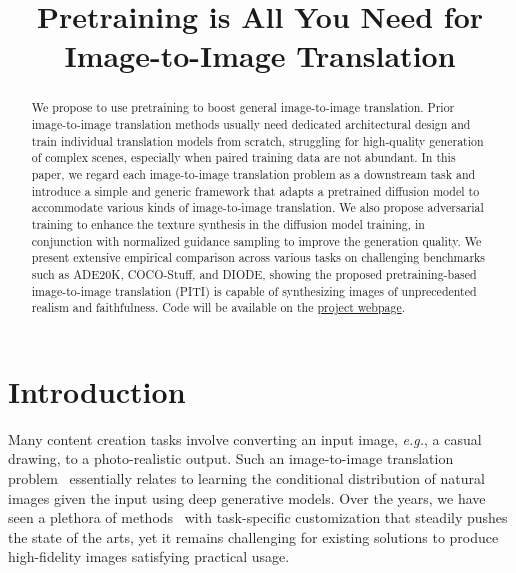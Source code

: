 \title{Pretraining is All You Need for Image-to-Image Translation}

\begin{abstract}
We propose to use pretraining to boost general image-to-image translation. Prior image-to-image translation methods usually need dedicated architectural design and train individual translation models from scratch, struggling for high-quality generation of complex scenes, especially when paired training data are not abundant. In this paper, we regard each image-to-image translation problem as a downstream task and introduce a simple and generic framework that adapts a pretrained diffusion model to accommodate various kinds of image-to-image translation. We also propose adversarial training to enhance the texture synthesis in the diffusion model training, in conjunction with normalized guidance sampling to improve the generation quality. We present extensive empirical comparison across various tasks on challenging benchmarks such as ADE20K, COCO-Stuff, and DIODE, showing the proposed pretraining-based image-to-image translation (PITI) is capable of synthesizing images of unprecedented realism and faithfulness. Code will be available on the \href{https://tengfei-wang.github.io/PITI/index.html}{project webpage}.
\end{abstract}

\section{Introduction}

Many content creation tasks involve converting an input image, \textit{e.g.}\@, a casual drawing, to a photo-realistic output. Such an image-to-image translation problem~\cite{isola2017image} essentially relates to learning the conditional distribution of natural images given the input using deep generative models. Over the years, we have seen a plethora of methods~\cite{pang2021image,liu2020generative} with task-specific customization that steadily pushes the state of the arts, yet it remains challenging for existing solutions to produce high-fidelity images satisfying practical usage.

